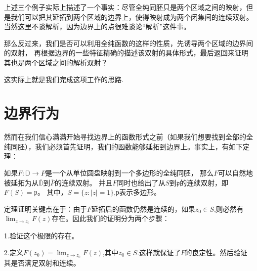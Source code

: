 \documentclass[UTF8]{ctexart}[a4paper,10pt]
\def\D{\mathbb{D}}
\begin{document}
    上述三个例子实际上描述了一个事实：尽管全纯同胚只是两个区域之间的映射，但是我们可以把其延拓到两个区域的边界上，使得映射成为两个闭集间的连续双射。
    当然这里不谈解析，因为边界上的点很难谈论“解析”这件事。

    那么反过来，我们是否可以利用全纯函数的这样的性质，先诱导两个区域的边界间的双射，
    再根据边界的一些特征精确的描述该双射的具体形式，最后返回来证明其也是两个区域之间的解析双射？
    
    这实际上就是我们完成这项工作的思路.
    \section{边界行为}
    然而在我们信心满满开始寻找边界上的函数形式之前（如果我们想要找到全部的全纯同胚），我们必须首先证明，我们的函数能够延拓到边界上。事实上，有如下定理：
    \begin{thm}
        如果$F:\D \rightarrow P$是一个从单位圆盘映射到一个多边形的全纯同胚，
        那么$F$可以自然地被延拓为从$\overline{\D}$到$\overline{P}$的连续双射。
        并且$F$同时也给出了从$S$到$\mathfrak{p}$的连续双射，即$F(S)=\mathfrak{p}$。
        其中，$S=\{z:|z|=1\}$,$\mathfrak{p}$表示多边形。
    \end{thm}
    定理证明关键点在于：由于$F$延拓后的函数仍然是连续的，如果$z_0 \in S$,则必然有$\lim_{z \to z_0}F(z)$存在。因此我们的证明分为两个步骤：
    
    1.验证这个极限的存在。

    2.定义$F(z_0)=\lim_{z \to z_0} F(z)$,其中$z_0 \in S$.这样就保证了$F$的良定性。然后验证其是否满足双射和连续。
\end{document}
